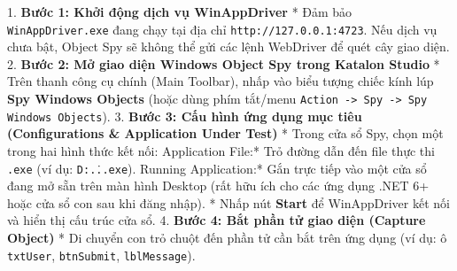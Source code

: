 1. \textbf{Bước 1: Khởi động dịch vụ WinAppDriver}
   * Đảm bảo \texttt{WinAppDriver.exe} đang chạy tại địa chỉ \texttt{http://127.0.0.1:4723}. Nếu dịch vụ chưa bật, Object Spy sẽ không thể gửi các lệnh WebDriver để quét cây giao diện.
2. \textbf{Bước 2: Mở giao diện Windows Object Spy trong Katalon Studio}
   * Trên thanh công cụ chính (Main Toolbar), nhấp vào biểu tượng chiếc kính lúp \textbf{Spy Windows Objects} (hoặc dùng phím tắt/menu \texttt{Action -> Spy -> Spy Windows Objects}).
3. \textbf{Bước 3: Cấu hình ứng dụng mục tiêu (Configurations & Application Under Test)}
   * Trong cửa sổ Spy, chọn một trong hai hình thức kết nối:
     \textit{ }Application File:* Trỏ đường dẫn đến file thực thi \texttt{.exe} (ví dụ: \texttt{D:\...\MiniSum.exe}).
     \textit{ }Running Application:* Gắn trực tiếp vào một cửa sổ đang mở sẵn trên màn hình Desktop (rất hữu ích cho các ứng dụng .NET 6+ hoặc cửa sổ con sau khi đăng nhập).
   * Nhấp nút \textbf{Start} để WinAppDriver kết nối và hiển thị cấu trúc cửa sổ.
4. \textbf{Bước 4: Bắt phần tử giao diện (Capture Object)}
   * Di chuyển con trỏ chuột đến phần tử cần bắt trên ứng dụng (ví dụ: ô \texttt{txtUser}, \texttt{btnSubmit}, \texttt{lblMessage}).
